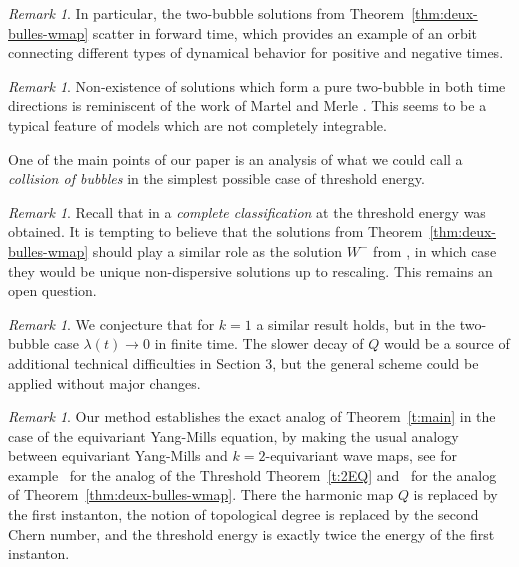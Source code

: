 \documentclass[10pt,reqno]{amsart}
\numberwithin{equation}{section}
\theoremstyle{remark}
\newtheorem{rem}[thm]{Remark}
\newcommand{\0}{\emptyset}
\begin{document}
 \begin{rem}
   In particular, the two-bubble solutions from Theorem~\ref{thm:deux-bulles-wmap}
   scatter in forward time, which provides an example of an orbit
   connecting different types of dynamical behavior for positive and negative times.
\end{rem}
\begin{rem}
   Non-existence of solutions which form a pure two-bubble in both time directions
   is reminiscent of the work of Martel and Merle \cite{MM11, MM11-2}.
   This seems to be a typical feature of models which are not completely integrable.

   One of the main points of our paper is an analysis of what we could call a \emph{collision
   of bubbles} in the simplest possible case of threshold energy. 
 \end{rem}
\begin{rem}
Recall that in \cite{DM} a \emph{complete classification} at the threshold energy
was obtained. It is tempting to believe that the solutions from Theorem~\ref{thm:deux-bulles-wmap} should play a similar role as the solution $W^-$ from \cite{DM},
in which case they would be unique non-dispersive solutions up to rescaling. This remains an open question.
\end{rem}


\begin{rem}
We conjecture that for $k = 1$ a similar result holds,
but in the two-bubble case $\lambda(t) \to 0$ in finite time.
The slower decay of $Q$ would be a source of additional
technical difficulties in Section 3, but the general scheme could be applied
without major changes.
\end{rem}
\begin{rem}
Our method establishes the exact analog of Theorem~\ref{t:main} in the case of the equivariant Yang-Mills equation, by making the usual analogy between equivariant Yang-Mills and $k=2$-equivariant wave maps, see for example~\cite[Appendix]{CKLS1} for the analog of the Threshold Theorem~\ref{t:2EQ} and~\cite{JJ-AJM} for the analog of Theorem~\ref{thm:deux-bulles-wmap}. There the harmonic map $Q$ is replaced by the first instanton, the notion of topological degree is replaced by the second Chern number, and the threshold energy is exactly twice the energy of the first instanton. 
\end{rem} 
\end{document}
